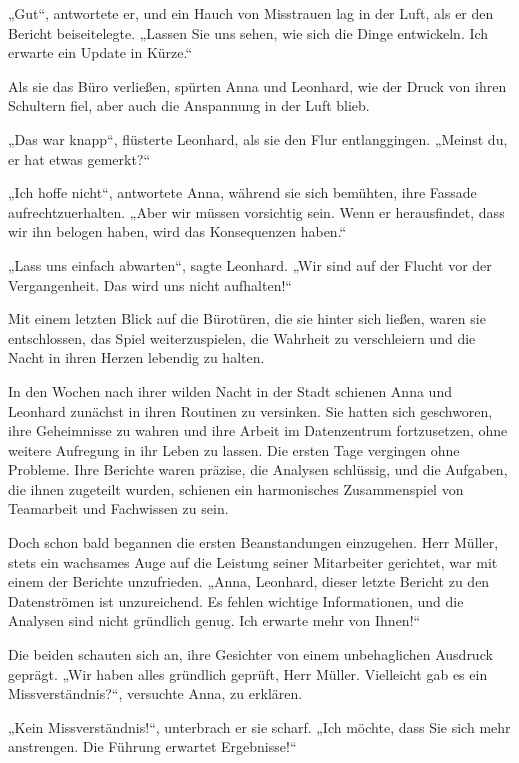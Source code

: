 \documentclass[
]{article}
\begin{document}
„Gut``, antwortete er, und ein Hauch von Misstrauen lag in der Luft, als
er den Bericht beiseitelegte. „Lassen Sie uns sehen, wie sich die Dinge
entwickeln. Ich erwarte ein Update in Kürze.``

Als sie das Büro verließen, spürten Anna und Leonhard, wie der Druck von
ihren Schultern fiel, aber auch die Anspannung in der Luft blieb.

„Das war knapp``, flüsterte Leonhard, als sie den Flur entlanggingen.
„Meinst du, er hat etwas gemerkt?{\kern0pt}``

„Ich hoffe nicht``, antwortete Anna, während sie sich bemühten, ihre
Fassade aufrechtzuerhalten. „Aber wir müssen vorsichtig sein. Wenn er
herausfindet, dass wir ihn belogen haben, wird das Konsequenzen haben.``

„Lass uns einfach abwarten``, sagte Leonhard. „Wir sind auf der Flucht
vor der Vergangenheit. Das wird uns nicht aufhalten!{\kern0pt}``

Mit einem letzten Blick auf die Bürotüren, die sie hinter sich ließen,
waren sie entschlossen, das Spiel weiterzuspielen, die Wahrheit zu
verschleiern und die Nacht in ihren Herzen lebendig zu halten.

In den Wochen nach ihrer wilden Nacht in der Stadt schienen Anna und
Leonhard zunächst in ihren Routinen zu versinken. Sie hatten sich
geschworen, ihre Geheimnisse zu wahren und ihre Arbeit im Datenzentrum
fortzusetzen, ohne weitere Aufregung in ihr Leben zu lassen. Die ersten
Tage vergingen ohne Probleme. Ihre Berichte waren präzise, die Analysen
schlüssig, und die Aufgaben, die ihnen zugeteilt wurden, schienen ein
harmonisches Zusammenspiel von Teamarbeit und Fachwissen zu sein.

Doch schon bald begannen die ersten Beanstandungen einzugehen. Herr
Müller, stets ein wachsames Auge auf die Leistung seiner Mitarbeiter
gerichtet, war mit einem der Berichte unzufrieden. „Anna, Leonhard,
dieser letzte Bericht zu den Datenströmen ist unzureichend. Es fehlen
wichtige Informationen, und die Analysen sind nicht gründlich genug. Ich
erwarte mehr von Ihnen!{\kern0pt}``

Die beiden schauten sich an, ihre Gesichter von einem unbehaglichen
Ausdruck geprägt. „Wir haben alles gründlich geprüft, Herr Müller.
Vielleicht gab es ein Missverständnis?{\kern0pt}``, versuchte Anna, zu
erklären.

„Kein Missverständnis!{\kern0pt}``, unterbrach er sie scharf. „Ich
möchte, dass Sie sich mehr anstrengen. Die Führung erwartet
Ergebnisse!{\kern0pt}``
\end{document}
